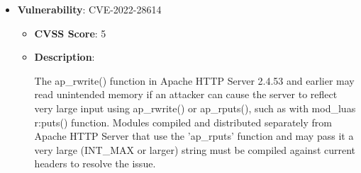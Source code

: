 \documentclass{article}
\begin{document}
\begin{itemize}
        \item \textbf{Vulnerability}: CVE-2022-28614
        \begin{itemize}
            \item \textbf{CVSS Score}:  5 
            \item \textbf{Description}:
            \parbox[t]{0.9\linewidth}{
                \ttfamily The ap\_rwrite() function in Apache HTTP Server 2.4.53 and earlier may read unintended memory if an attacker can cause the server to reflect very large input using ap\_rwrite() or ap\_rputs(), such as with mod\_luas r:puts() function. Modules compiled and distributed separately from Apache HTTP Server that use the 'ap\_rputs' function and may pass it a very large (INT\_MAX or larger) string must be compiled against current headers to resolve the issue.
            }
        \end{itemize}
    

\end{itemize}
\end{document}
